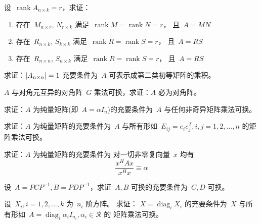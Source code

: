 \documentclass[twoside,openright]{book}
\begin{document}
\begin{CJK*}{UTF8}{}
\begin{quest}
\label{quest:29}
\end{quest}

\begin{quest}
\label{quest:30}
设\ $\operatorname{rank}A_{n\times k}=r$，求证：
\begin{enumerate}
\item
存在\ $M_{n\times r}$,
$N_{r\times k}$ 满足\ $\operatorname{rank}M=\operatorname{rank}N=r$，
且\ $A=MN$
\item
存在\ $R_{n\times k}$,
$S_{k\times k}$ 满足\ $\operatorname{rank}R=\operatorname{rank}S=r$，
且\ $A=RS$
\item
存在\ $R_{n\times n}$,
$S_{n\times k}$ 满足\ $\operatorname{rank}R=\operatorname{rank}S=r$，
且\ $A=RS$
\end{enumerate}
\end{quest}

\begin{quest}
\label{quest:31}
求证：$\lvert{A_{n\times n}}\rvert=1$ 充要条件为\ $A$ 可表示成第二类初等矩阵的乘积。
\end{quest}

\begin{quest}
\label{quest:32}
$A$ 与对角元互异的对角阵\ $G$ 乘法可换，求证：$A$ 必为对角阵。
\end{quest}

\begin{quest}
\label{quest:33}
求证：$A$ 为纯量矩阵(即\ $A=\alpha I_n$)的充要条件为\ $A$ 与任何非奇异矩阵乘法可换。
\end{quest}

\begin{quest}
\label{quest:34}
求证：$A$ 为纯量矩阵的充要条件为\ $A$ 与所有形如\ $E_{ij}=e_ie_j^T,i,j=1,2,\dotsc,n$ 的矩阵乘法可换。
\end{quest}

\begin{quest}
\label{quest:35}
求证：$A$ 为纯量矩阵的充要条件为
对一切非零复向量\ $x$ 均有
\[
\frac{x^HAx}{x^Hx}\equiv\alpha
\]
\end{quest}

\begin{quest}
\label{quest:36}
设\ $A=PCP^{-1},B=PDP^{-1}$，求证\ $A,B$ 可换的充要条件为\ $C,D$ 可换。
\end{quest}

\begin{quest}
\label{quest:37}
设\ $X_i,i=1,2,\dotsc,k$ 为\ $n_i$ 阶方阵。
求证：
$X=\operatorname{diag}_iX_i$ 的充要条件为\ $X$ 与所有形如\ $A=\operatorname{diag}_i\alpha_iI_{n_i},\alpha_i\in\mathcal{R}$ 的
矩阵乘法可换。
\end{quest}


\end{CJK*}
\end{document}
